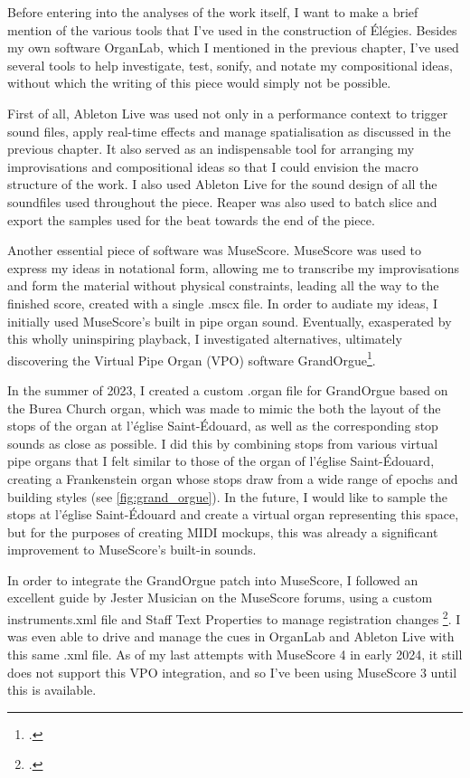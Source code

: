 \documentclass[12pt,twoside,maitrise]{dms_ks}
\theoremstyle{definition}
\begin{document}
{Before entering into the analyses of the work itself, I want to make a brief mention of the various tools that I've used in the construction of Élégies. 
Besides my own software OrganLab, which I mentioned in the previous chapter, I've used several tools to help investigate, test, sonify, and notate my compositional ideas, without which the writing of this piece would simply not be possible. 

First of all, Ableton Live was used not only in a performance context to trigger sound files, apply real-time effects and manage spatialisation as discussed in the previous chapter. 
It also served as an indispensable tool for arranging my improvisations and compositional ideas so that I could envision the macro structure of the work. 
I also used Ableton Live for the sound design of all the soundfiles used throughout the piece. 
Reaper was also used to batch slice and export the samples used for the beat towards the end of the piece.

Another essential piece of software was MuseScore. 
MuseScore was used to express my ideas in notational form, allowing me to transcribe my improvisations and form the material without physical constraints, leading all the way to the finished score, created with a single .mscx file.
In order to audiate my ideas, I initially used MuseScore's built in pipe organ sound. 
Eventually, exasperated by this wholly uninspiring playback, I investigated alternatives, ultimately discovering the Virtual Pipe Organ (VPO) software GrandOrgue\footcite{noauthor_grandorguegrandorgue_2025}. 

In the summer of 2023, I created a custom .organ file for GrandOrgue based on the Burea Church organ, which was made to mimic the both the layout of the stops of the organ at l'église Saint-Édouard, as well as the corresponding stop sounds as close as possible. 
I did this by combining stops from various virtual pipe organs that I felt similar to those of the organ of l'église Saint-Édouard, creating a Frankenstein organ whose stops draw from a wide range of epochs and building styles (see \cref{fig:grand_orgue}). 
In the future, I would like to sample the stops at l'église Saint-Édouard and create a virtual organ representing this space, but for the purposes of creating MIDI mockups, this was already a significant improvement to MuseScore's built-in sounds. 

In order to integrate the GrandOrgue patch into MuseScore, I followed an excellent guide by Jester Musician on the MuseScore forums, using a custom instruments.xml file and Staff Text Properties to manage registration changes \footcite{musician_jester_how_2018}. 
I was even able to drive and manage the cues in OrganLab and Ableton Live with this same .xml file. 
As of my last attempts with MuseScore 4 in early 2024, it still does not support this VPO integration, and so I've been using MuseScore 3 until this is available.

}
\end{document}
